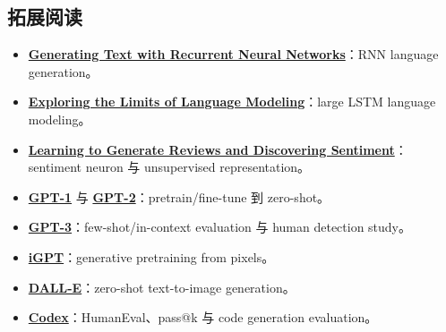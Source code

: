 \subsection{拓展阅读}

{\small
\begin{itemize}[nosep,leftmargin=*]
  \item \href{https://www.cs.utoronto.ca/~ilya/pubs/2011/LANG-RNN.pdf}{\textbf{Generating Text with Recurrent Neural Networks}}：RNN language generation。
  \item \href{https://arxiv.org/abs/1602.02410}{\textbf{Exploring the Limits of Language Modeling}}：large LSTM language modeling。
  \item \href{https://arxiv.org/abs/1704.01444}{\textbf{Learning to Generate Reviews and Discovering Sentiment}}：sentiment neuron 与 unsupervised representation。
  \item \href{https://cdn.openai.com/research-covers/language-unsupervised/language_understanding_paper.pdf}{\textbf{GPT-1}} 与 \href{https://cdn.openai.com/better-language-models/language_models_are_unsupervised_multitask_learners.pdf}{\textbf{GPT-2}}：pretrain/fine-tune 到 zero-shot。
  \item \href{https://arxiv.org/abs/2005.14165}{\textbf{GPT-3}}：few-shot/in-context evaluation 与 human detection study。
  \item \href{https://arxiv.org/abs/2006.10738}{\textbf{iGPT}}：generative pretraining from pixels。
  \item \href{https://arxiv.org/abs/2102.12092}{\textbf{DALL-E}}：zero-shot text-to-image generation。
  \item \href{https://arxiv.org/abs/2107.03374}{\textbf{Codex}}：HumanEval、pass@k 与 code generation evaluation。
\end{itemize}
}


